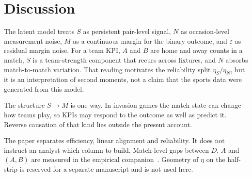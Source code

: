 \section{Discussion}
\label{sec:discussion}

The latent model treats $S$ as persistent pair-level signal, $N$ as occasion-level measurement noise, $M$ as a continuous margin for the binary outcome, and $\varepsilon$ as residual margin noise.
For a team KPI, $A$ and $B$ are home and away counts in a match, $S$ is a team-strength component that recurs across fixtures, and $N$ absorbs match-to-match variation.
That reading motivates the reliability split $\eta_S/\eta_N$, but it is an interpretation of second moments, not a claim that the sports data were generated from this model.

The structure $S\to M$ is one-way.
In invasion games the match state can change how teams play, so KPIs may respond to the outcome as well as predict it.
Reverse causation of that kind lies outside the present account.

The paper separates efficiency, linear alignment and reliability.
It does not instruct an analyst which column to build.
Match-level gaps between $D$, $A$ and $(A,B)$ are measured in the empirical companion~\parencite{brownPEFempirical}.
Geometry of $\eta$ on the half-strip is reserved for a separate manuscript and is not used here.
